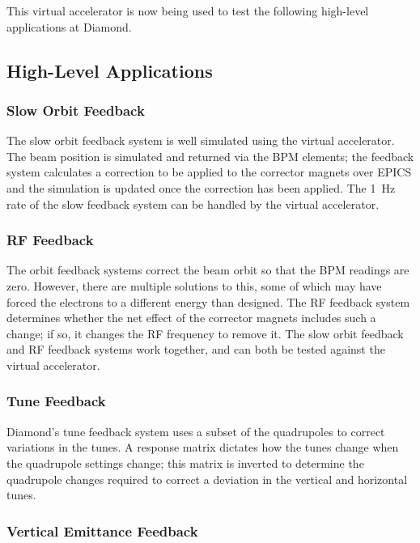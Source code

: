 \documentclass[a4paper,
               keeplastbox,   %
               ]{jacow}
\begin{document}
This virtual accelerator is now being used to test the following high-level applications
at Diamond.

\subsection{High-Level Applications}

\subsubsection{Slow Orbit Feedback}

The slow orbit feedback system is well simulated using the virtual accelerator.
The beam position is simulated and returned via the BPM elements; the feedback
system calculates a correction to be applied to the corrector magnets over EPICS
and the simulation is updated once the correction has been applied. The \SI{1}{Hz} rate
of the slow feedback system can be handled by the virtual accelerator.

\subsubsection{RF Feedback} 

The orbit feedback systems correct the beam orbit so that the BPM readings are zero.
However, there are multiple solutions to this, some of which may have forced the
electrons to a different energy than designed. The RF feedback system determines
whether the net effect of the corrector magnets includes such a change; if so, it
changes the RF frequency to remove it. The slow orbit feedback and RF feedback 
systems work together, and can both be tested against the virtual accelerator.

\subsubsection{Tune Feedback}

Diamond's tune feedback system \cite{feedbacks} uses a subset of the quadrupoles 
to correct variations in the tunes. A response matrix dictates how the tunes 
change when the quadrupole settings change; this matrix is inverted to determine 
the quadrupole changes required to correct a deviation in the vertical and 
horizontal tunes.

\subsubsection{Vertical Emittance Feedback}
\end{document}
